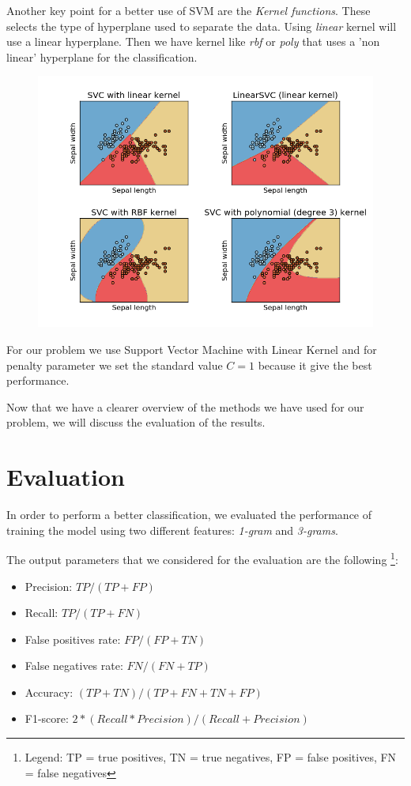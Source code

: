 \documentclass[12pt]{article}
\begin{document}
Another key point for a better use of SVM are the {\em Kernel functions}. These selects the type of hyperplane used to separate the data. Using {\em linear} kernel will use a linear hyperplane. Then we have kernel like {\em rbf} or {\em poly} that uses a 'non linear' hyperplane for the classification.
\begin{figure}[!ht]
  \includegraphics[width=1\textwidth]{pic1}
  \label{fig:Example of SVM}
\end{figure}
\newline
For our problem we use Support Vector Machine with Linear Kernel and for penalty parameter we set the standard value $C = 1$ because it give the best performance.

Now that we have a clearer overview of the methods we have used for our problem, we will discuss the evaluation of the results.

\section{Evaluation}
In order to perform a better classification, we evaluated the performance of training the model using two different features: {\em 1-gram} and {\em 3-grams}.

The output parameters that we considered for the evaluation are the following \footnote{Legend: TP = true positives, TN = true negatives, FP = false positives, FN = false negatives}:

\begin{itemize}
\item Precision: $TP / (TP + FP)$
\item Recall: $TP / (TP + FN)$
\item False positives rate: $FP / (FP + TN)$
\item False negatives rate: $FN / (FN + TP)$
\item Accuracy: $(TP + TN) / (TP + FN + TN + FP)$
\item F1-score: $ 2*(Recall*Precision)/(Recall+Precision)$
\end{itemize}
\end{document}
